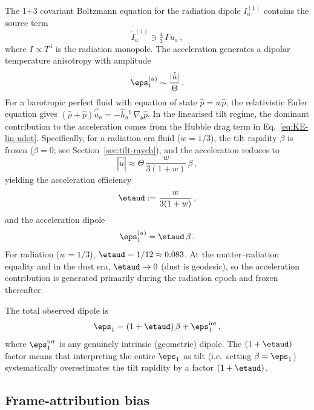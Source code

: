 The 1+3 covariant Boltzmann equation for the radiation dipole
$I_a^{(1)}$ contains the source
term~\cite{MaartensGE1999,ChallinorLasenby1999}
\begin{equation}\label{eq:boltz-dipole}
\dot{I}_a^{(1)} \ni \tfrac{4}{3}\,I\,\dot{u}_a\,,
\end{equation}
where $I \propto T^4$ is the radiation monopole.  The
acceleration generates a dipolar temperature anisotropy with
amplitude
\begin{equation}\label{eq:eps1-udot-raw}
\eps_1^{(\dot{u})}
\sim \frac{|\hat{\dot{u}}|}{\Theta}\,.
\end{equation}
For a barotropic perfect fluid with equation of state
$\hat{p} = w\hat{\rho}$, the relativistic Euler equation gives
$(\hat{\rho} + \hat{p})\hat{\dot{u}}_a
= -\hat{h}_a{}^b\,\nabla_b \hat{p}$.
In the linearised tilt regime, the dominant contribution
to the acceleration comes from the Hubble drag term in
Eq.~\eqref{eq:KE-lin-udot}.  Specifically, for a radiation-era
fluid ($w = 1/3$), the tilt rapidity $\beta$ is frozen
($\dot{\beta} = 0$; see Section~\ref{sec:tilt-raych}), and
the acceleration reduces to
\begin{equation}
|\hat{\dot{u}}| \approx \Theta\,
  \frac{w}{3(1+w)}\,\beta\,,
\end{equation}
yielding the acceleration efficiency
\begin{equation}\label{eq:eta-udot}
\etaud := \frac{w}{3(1+w)}\,,
\end{equation}
and the acceleration dipole
\begin{equation}\label{eq:eps1-udot}
\eps_1^{(\dot{u})} = \etaud\,\beta\,.
\end{equation}
For radiation ($w = 1/3$), $\etaud = 1/12 \approx 0.083$.
At the matter--radiation equality and in the dust era,
$\etaud \to 0$ (dust is geodesic), so the acceleration
contribution is generated primarily during the radiation epoch
and frozen thereafter.

The total observed dipole is
\begin{equation}\label{eq:eps1-total}
\eps_1 = (1 + \etaud)\,\beta + \eps_1^{\mathrm{int}}\,,
\end{equation}
where $\eps_1^{\mathrm{int}}$ is any genuinely intrinsic
(geometric) dipole.  The $(1 + \etaud)$ factor means that
interpreting the entire $\eps_1$ as tilt (i.e.\ setting
$\beta = \eps_1$) systematically overestimates the tilt
rapidity by a factor $(1 + \etaud)$.


\subsection{Frame-attribution bias}\label{sec:frame-bias}

